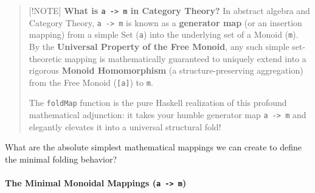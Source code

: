 \documentclass[
]{article}
\begin{document}
\begin{quote}
{[}!NOTE{]} \textbf{What is \texttt{a\ -\textgreater{}\ m} in Category
Theory?} In abstract algebra and Category Theory,
\texttt{a\ -\textgreater{}\ m} is known as a \textbf{generator map} (or
an insertion mapping) from a simple Set (\texttt{a}) into the underlying
set of a Monoid (\texttt{m}). By the \textbf{Universal Property of the
Free Monoid}, any such simple set-theoretic mapping is mathematically
guaranteed to uniquely extend into a rigorous \textbf{Monoid
Homomorphism} (a structure-preserving aggregation) from the Free Monoid
(\texttt{{[}a{]}}) to \texttt{m}.

The \texttt{foldMap} function is the pure Haskell realization of this
profound mathematical adjunction: it takes your humble generator map
\texttt{a\ -\textgreater{}\ m} and elegantly elevates it into a
universal structural fold!
\end{quote}

What are the absolute simplest mathematical mappings we can create to
define the minimal folding behavior?

\paragraph{\texorpdfstring{The Minimal Monoidal Mappings
(\texttt{a\ -\textgreater{}\ m})}{The Minimal Monoidal Mappings (a -\textgreater{} m)}}\label{the-minimal-monoidal-mappings-a---m}
\end{document}
